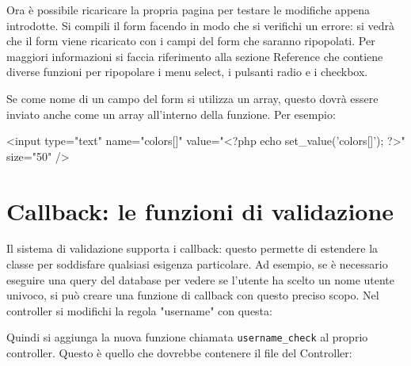 Ora è possibile ricaricare la propria pagina per testare le modifiche appena introdotte. Si compili il form facendo in modo che si verifichi un errore: si vedrà che il form viene ricaricato con i campi del form che saranno ripopolati. Per maggiori informazioni si faccia riferimento alla sezione Reference che contiene diverse funzioni per ripopolare i menu select, i pulsanti radio e i checkbox.

Se come nome di un campo del form si utilizza un array, questo dovrà essere inviato anche come un array all'interno della funzione. Per esempio:

\begin{code}
<input type="text" name="colors[]" value="<?php echo set_value('colors[]'); ?>" size="50" />
\end{code}

\section*{Callback: le funzioni di validazione}
Il sistema di validazione supporta i callback: questo permette di estendere la classe per soddisfare qualsiasi esigenza particolare. Ad esempio, se è necessario eseguire una query del database per vedere se l'utente ha scelto un nome utente univoco, si può creare una funzione di callback con questo preciso scopo. Nel controller si modifichi la regola "username" con questa:


Quindi si aggiunga la nuova funzione chiamata \verb|username_check| al proprio controller. Questo è quello che dovrebbe contenere il file del Controller:


